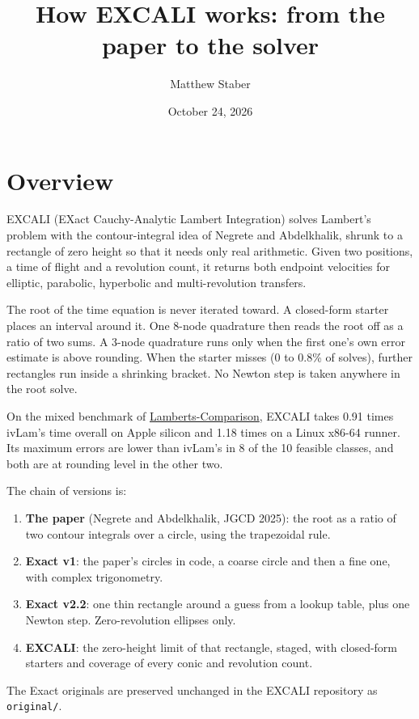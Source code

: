 \documentclass[11pt]{article}
\title{How EXCALI works: from the paper to the solver}
\author{Matthew Staber}
\date{October 24, 2026}
\newcommand{\code}[1]{\texttt{#1}}
\begin{document}
\maketitle

\section{Overview}

EXCALI (EXact Cauchy-Analytic Lambert Integration) solves Lambert's problem with the contour-integral idea of Negrete and Abdelkhalik, shrunk to a rectangle of zero height so that it needs only real arithmetic. Given two positions, a time of flight and a revolution count, it returns both endpoint velocities for elliptic, parabolic, hyperbolic and multi-revolution transfers.

The root of the time equation is never iterated toward. A closed-form starter places an interval around it. One 8-node quadrature then reads the root off as a ratio of two sums. A 3-node quadrature runs only when the first one's own error estimate is above rounding. When the starter misses (0 to 0.8\% of solves), further rectangles run inside a shrinking bracket. No Newton step is taken anywhere in the root solve.

On the mixed benchmark of \href{https://github.com/Ossama-Abdelkhalik-Lab/Lamberts-Comparison}{Lamberts-Comparison}, EXCALI takes 0.91 times ivLam's time overall on Apple silicon and 1.18 times on a Linux x86-64 runner. Its maximum errors are lower than ivLam's in 8 of the 10 feasible classes, and both are at rounding level in the other two.

The chain of versions is:
\begin{enumerate}
  \item \textbf{The paper} (Negrete and Abdelkhalik, JGCD 2025): the root as a ratio of two contour integrals over a circle, using the trapezoidal rule.
  \item \textbf{Exact v1}: the paper's circles in code, a coarse circle and then a fine one, with complex trigonometry.
  \item \textbf{Exact v2.2}: one thin rectangle around a guess from a lookup table, plus one Newton step. Zero-revolution ellipses only.
  \item \textbf{EXCALI}: the zero-height limit of that rectangle, staged, with closed-form starters and coverage of every conic and revolution count.
\end{enumerate}
The Exact originals are preserved unchanged in the EXCALI repository as \code{original/}.
\end{document}
